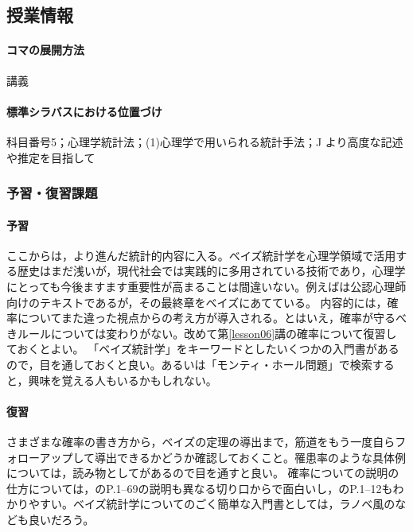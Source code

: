 \subsection{授業情報}
\paragraph{コマの展開方法}
講義
\paragraph{標準シラバスにおける位置づけ}
科目番号5；心理学統計法；(1)心理学で用いられる統計手法；J より高度な記述や推定を目指して
\subsubsection{予習・復習課題}
\paragraph{予習}
ここからは，より進んだ統計的内容に入る。ベイズ統計学を心理学領域で活用する歴史はまだ浅いが，現代社会では実践的に多用されている技術であり，心理学にとっても今後ますます重要性が高まることは間違いない。例えば\citet{野島201903}は公認心理師向けのテキストであるが，その最終章をベイズにあてている。
内容的には，確率についてまた違った視点からの考え方が導入される。とはいえ，確率が守るべきルールについては変わりがない。改めて第\ref{lesson06}講の確率について復習しておくとよい。
「ベイズ統計学」をキーワードとしたいくつかの入門書があるので，目を通しておくと良い。あるいは「モンティ・ホール問題」で検索すると，興味を覚える人もいるかもしれない。
\paragraph{復習}
さまざまな確率の書き方から，ベイズの定理の導出まで，筋道をもう一度自らフォローアップして導出できるかどうか確認しておくこと。罹患率のような具体例については，読み物として\citet{Gerd200309}があるので目を通すと良い。
確率についての説明の仕方については，\citet{平岡200910}のP.1--69の説明も異なる切り口からで面白いし，\citet{石田201801}のP.1--12もわかりやすい。ベイズ統計学についてのごく簡単な入門書としては，ラノベ風の\citet{石田石田201902}なども良いだろう。
